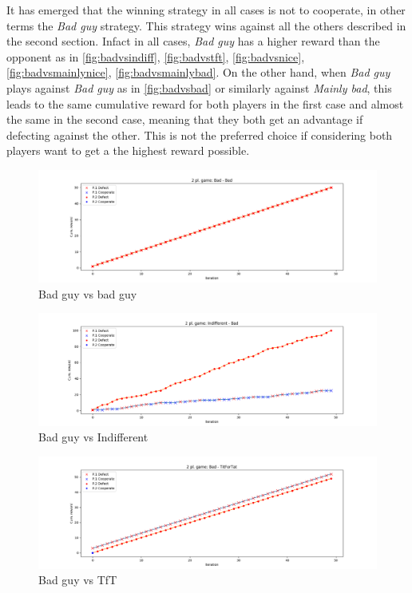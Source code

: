 \documentclass[journal,a4paper,10pt,twoside]{IEEEtran}
\begin{document}
It has emerged that the winning strategy in all cases is not to cooperate, in other terms the \textit{Bad guy} strategy. This strategy wins against all the others described in the second section. Infact in all cases, \textit{Bad guy} has a higher reward than the opponent as in \autoref{fig:badvsindiff}, \autoref{fig:badvstft}, \autoref{fig:badvsnice}, \autoref{fig:badvsmainlynice}, \autoref{fig:badvsmainlybad}. 
On the other hand, when \textit{Bad guy} plays against \textit{Bad guy} as in \autoref{fig:badvsbad} or similarly against \textit{Mainly bad}, this leads to the same cumulative reward for both players in the first case and almost the same in the second case, meaning that they both get an advantage if defecting against the other. This is not the preferred choice if considering both players want to get a the highest reward possible.

\begin{figure}
    \centering
    \includegraphics[width=1\columnwidth]{../img_v1/idp2p-rewards-Bad-Bad.png}
    \caption{Bad guy vs bad guy}
    \label{fig:badvsbad}
\end{figure}

\begin{figure}
    \centering
    \includegraphics[width=1\columnwidth]{../img_v1/idp2p-rewards-Indifferent-Bad.png}
    \caption{Bad guy vs Indifferent}
    \label{fig:badvsindiff}
\end{figure}

\begin{figure}
    \centering
    \includegraphics[width=1\columnwidth]{../img_v1/idp2p-rewards-Bad-TitForTat.png}
    \caption{Bad guy vs TfT}
    \label{fig:badvstft}
\end{figure}
\end{document}
